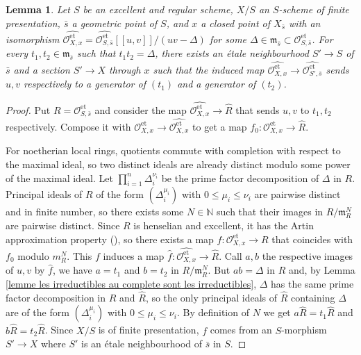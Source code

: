 \documentclass[a4paper,12pt]{amsart} %
\numberwithin{equation}{subsection}
\newcommand{\on}[1]{\operatorname{#1}}
\def\NN{\mathbb N}
\theoremstyle{definition}
\theoremstyle{plain}%
\newtheorem{lemma}[definition]{Lemma}
\theoremstyle{remark}
\renewcommand{\O}{\mathcal{O}}
\begin{document}
\begin{lemma}\label{lemme existence des sections avant completion pour raffinements asymetriques}
Let $S$ be an excellent and regular scheme, $X/S$ an $S$-scheme of finite presentation, $\bar s$ a geometric point of $S$, and $x$ a closed point of $X_{\bar s}$ with an isomorphism $\widehat{\O_{X,x}^{\on{et}}}=\widehat{\O_{S,\bar s}^{\on{et}}}[[u,v]]/(uv-\Delta)$ for some $\Delta\in\mathfrak{m}_{\bar s}\subset \O_{S,{\bar s}}^{\on{et}}$. For every $t_1,t_2\in \mathfrak{m}_{\bar s}$ such that $t_1t_2=\Delta$, there exists an \'etale neighbourhood $S' \to S$ of ${\bar s}$ and a section $S' \to X$ through $x$ such that the induced map $\widehat{\O_{X,x}^{\on{et}}}\to\widehat{\O_{S',{\bar s}}^{\on{et}}}$ sends $u,v$ respectively to a generator of $(t_1)$ and a generator of $(t_2)$.
\end{lemma}

\begin{proof}
Put $R=\O_{S,{\bar s}}^{\on{et}}$ and consider the map $\widehat{\O_{X,x}^{\on{et}}}\to\widehat{R}$ that sends $u,v$ to $t_1,t_2$ respectively. Compose it with $\O_{X,x}^{\on{et}}\to\widehat{\O_{X,x}^{\on{et}}}$ to get a map $f_0:\O_{X,x}^{\on{et}}\to\widehat{R}$.

For noetherian local rings, quotients commute with completion with respect to the maximal ideal, so two distinct ideals are already distinct modulo some power of the maximal ideal. Let $\prod\limits_{i=1}^n\Delta_i^{\nu_i}$ be the prime factor decomposition of $\Delta$ in $R$. Principal ideals of $R$ of the form $(\Delta_i^{\mu_i})$ with $0\leq\mu_i\leq\nu_i$ are pairwise distinct and in finite number, so there exists some $N\in\NN$ such that their images in $R/\mathfrak{m}_R^N$ are pairwise distinct. Since $R$ is henselian and excellent, it has the Artin approximation property (\cite[\href{https://stacks.math.columbia.edu/tag/07QY}{Tag 07QY}]{stacks-project}), so there exists a map $f\colon\O_{X,x}^{\on{et}}\to R$ that coincides with $f_0$ modulo $m_R^N$. This $f$ induces a map $\widehat{f}:\widehat{\O_{X,x}^{\on{et}}}\to\widehat{R}$. Call $a,b$ the respective images of $u,v$ by $\widehat{f}$, we have $a=t_1$ and $b=t_2$ in $R/\mathfrak{m}_R^N$. But $ab=\Delta$ in $\widehat{R}$ and, by Lemma \ref{lemme les irreductibles au complete sont les irreductibles}, $\Delta$ has the same prime factor decomposition in $R$ and $\widehat{R}$, so the only principal ideals of $\widehat{R}$ containing $\Delta$ are of the form $(\Delta_i^{\mu_i})$ with $0\leq\mu_i\leq\nu_i$. By definition of $N$ we get $a\widehat{R}=t_1\widehat{R}$ and $b\widehat{R}=t_2\widehat{R}$. Since $X/S$ is of finite presentation, $f$ comes from an $S$-morphism $S' \to X$ where $S'$ is an \'etale neighbourhood of ${\bar s}$ in $S$.
\end{proof}
\end{document}
